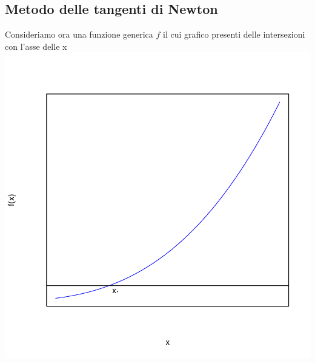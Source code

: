 \documentclass[onecolumn,11pt]{book}
\begin{document}
 \subsection{Metodo delle tangenti di Newton}
 Consideriamo ora una funzione generica $f$ il cui grafico presenti delle intersezioni con l'asse delle x
\includegraphics{Rmatematica-129}
\end{document}
